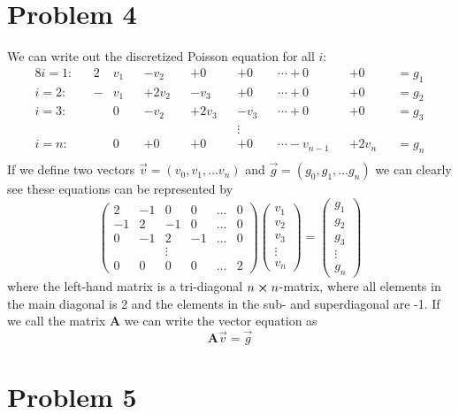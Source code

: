 \documentclass[english,notitlepage]{revtex4-2}  %
\begin{document}
\section*{Problem 4}
We can write out the discretized Poisson equation for all $i$:
\begin{alignat*}{8}
	i=1:&& 2&v_1&& -v_2&& + 0&& + 0&& \cdots+ 0&&+ 0&&=g_1 \\
	i=2:&& -&v_1&& +2v_2&& - v_3&& + 0&& \cdots+ 0&&+ 0&&=g_2 \\
	i=3:&& &0&& -v_2&& + 2v_3&& - v_3&& \cdots+0&&+ 0&&=g_3 \\
	&& & && && && \vdots && && && \\
	i=n:&& &0&& +0&& + 0&& +0&& \cdots-v_{n-1}&&+2v_n &&=g_n \\
\end{alignat*}
If we define two vectors $\vec{v}=(v_0, v_1,\ldots v_n)$ and $\vec{g}=(g_0, g_1,\ldots g_n)$ we can clearly see these equations can be represented by 
\begin{equation}
	\begin{pmatrix}
		2 & -1 & 0 & 0 & \ldots & 0 \\
		-1 & 2 & -1 & 0 & \ldots & 0 \\
		0 & -1 & 2 & -1 & \ldots & 0 \\
		& & \vdots & & & \\
		0 & 0 & 0 & 0 & \ldots & 2 
	\end{pmatrix}
	\begin{pmatrix}
		v_1 \\
		v_2 \\ 
		v_3 \\
		\vdots \\ 
		v_n
	\end{pmatrix}
	=
	\begin{pmatrix}
		g_1 \\
		g_2 \\ 
		g_3 \\
		\vdots \\ 
		g_n
	\end{pmatrix}
\end{equation}
where the left-hand matrix is a tri-diagonal $n\cross n$-matrix, where all elements in the main diagonal is 2 and the elements in the sub- and superdiagonal are -1. If we call the matrix \textbf{A} we can write the vector equation as 
\begin{equation}\label{eq:1}
	\textbf{A}\vec{v}=\vec{g}
\end{equation}

\section*{Problem 5}
\end{document}
